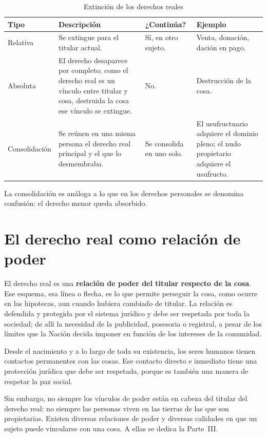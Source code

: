 \documentclass[12pt,oneside]{book}
\begin{document}
\begin{table}[H]
\centering
\small
\begin{tabularx}{\textwidth}{>{\raggedright\arraybackslash}p{}>{\raggedright\arraybackslash}X>{\raggedright\arraybackslash}p{}>{\raggedright\arraybackslash}p{}}
\toprule
\textbf{Tipo} & \textbf{Descripción} & \textbf{¿Continúa?} & \textbf{Ejemplo} \\
\midrule
Relativa & Se extingue para el titular actual. & Sí, en otro sujeto. & Venta, donación, dación en pago. \\
Absoluta & El derecho desaparece por completo; como el derecho real es un vínculo entre titular y cosa, destruida la cosa ese vínculo se extingue. & No. & Destrucción de la cosa. \\
Consolidación & Se reúnen en una misma persona el derecho real principal y el que lo desmembraba. & Se consolida en uno solo. & El usufructuario adquiere el dominio pleno; el nudo propietario adquiere el usufructo. \\
\bottomrule
\end{tabularx}
\caption{Extinción de los derechos reales}
\end{table}

La consolidación es análoga a lo que en los derechos personales se denomina confusión: el derecho menor queda absorbido.

\section{El derecho real como relación de poder}

El derecho real es una \textbf{relación de poder del titular respecto de la cosa}. Ese esquema, esa línea o flecha, es lo que permite perseguir la cosa, como ocurre en las hipotecas, aun cuando hubiera cambiado de titular. La relación es defendida y protegida por el sistema jurídico y debe ser respetada por toda la sociedad; de allí la necesidad de la publicidad, posesoria o registral, a pesar de los límites que la Nación decida imponer en función de los intereses de la comunidad.

Desde el nacimiento y a lo largo de toda su existencia, los seres humanos tienen contactos permanentes con las cosas. Ese contacto directo e inmediato tiene una protección jurídica que debe ser respetada, porque es también una manera de respetar la paz social.

Sin embargo, no siempre los vínculos de poder están en cabeza del titular del derecho real: no siempre las personas viven en las tierras de las que son propietarias. Existen diversas relaciones de poder y diversas calidades en que un sujeto puede vincularse con una cosa. A ellas se dedica la Parte~III.
\end{document}
